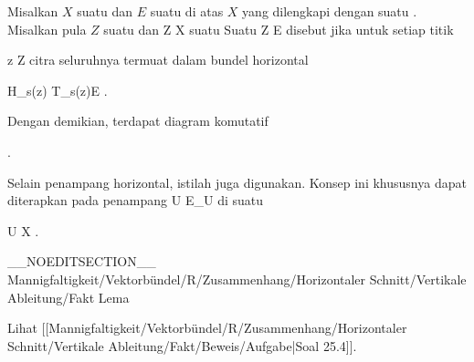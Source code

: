 \setcounter{section}{25}


{}
{

Misalkan $X$ suatu
dan $E$ suatu
di atas $X$ yang dilengkapi dengan suatu
.
Misalkan pula $Z$ suatu
dan
\maabbdisp {\psi} { Z } { X
} {}
suatu
Suatu
 { Z } { E
} {}
 {} {}
disebut
jika untuk setiap titik

\mavergleichskette
{\vergleichskette
{ z
}
{ \in }{ Z
}
{  }{
}
{    }{
}
{   }{
}
}
{}{}{}
citra
 seluruhnya termuat dalam bundel horizontal

\mavergleichskette
{\vergleichskette
{ H_{s(z)}
}
{ \subseteq }{ T_{s(z)}E
}
{  }{
}
{    }{
}
{   }{
}
}
{}{}{}.

}

Dengan demikian, terdapat diagram komutatif

 {  }.

Selain penampang horizontal, istilah  {} juga digunakan. Konsep ini khususnya dapat diterapkan pada penampang
 { U } { E\vert_U
} {}
di suatu

\mavergleichskette
{\vergleichskette
{ U
}
{ \subseteq }{ X
}
{  }{
}
{    }{
}
{   }{
}
}
{}{}{}.

__NOEDITSECTION__
{Mannigfaltigkeit/Vektorbündel/R/Zusammenhang/Horizontaler Schnitt/Vertikale Ableitung/Fakt}
{Lema}
{}
{

\faktzusatz {}
\faktzusatz {}

 }
{ Lihat [[Mannigfaltigkeit/Vektorbündel/R/Zusammenhang/Horizontaler Schnitt/Vertikale Ableitung/Fakt/Beweis/Aufgabe|Soal 25.4]]. }

